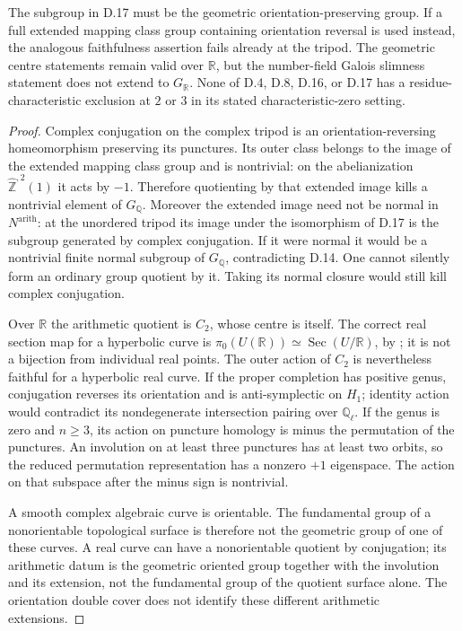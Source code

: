 The subgroup in D.17 must be the geometric orientation-preserving group.
If a full extended mapping class group containing orientation reversal is
used instead, the analogous faithfulness assertion fails already at the
tripod.  The geometric centre statements remain valid over $\mathbb R$,
but the number-field Galois slimness statement does not extend to
$G_{\mathbb R}$.  None of D.4, D.8, D.16, or D.17 has a residue-characteristic
exclusion at $2$ or $3$ in its stated characteristic-zero setting.
\begin{proof}
Complex conjugation on the complex tripod is an orientation-reversing
homeomorphism preserving its punctures.  Its outer class belongs to the
image of the extended mapping class group and is nontrivial: on the
abelianization $\widehat{\mathbb Z}^{,2}(1)$ it acts by $-1$.
Therefore quotienting by that extended image kills a nontrivial element
of $G_{\mathbb Q}$.  Moreover the extended image need not be normal in
$N^{\mathrm{arith}}$: at the unordered tripod its image under the
isomorphism of D.17 is the subgroup generated by complex conjugation.
If it were normal it would be a nontrivial finite normal subgroup of
$G_{\mathbb Q}$, contradicting D.14.  One cannot silently form an ordinary
group quotient by it.  Taking its normal closure would still kill complex
conjugation.

Over $\mathbb R$ the arithmetic quotient is $C_2$, whose centre is itself.
The correct real section map for a hyperbolic curve is
$\pi_0(U(\mathbb R))\simeq\operatorname{Sec}(U/\mathbb R)$, by
\citet[Introduction, Theorem]{BrescianiVistoli2020}; it is not a bijection
from individual real points.  The outer action of $C_2$ is nevertheless
faithful for a hyperbolic real curve.  If the proper completion has positive
genus, conjugation reverses its orientation and is anti-symplectic on
$H_1$; identity action would contradict its nondegenerate intersection
pairing over $\mathbb Q_\ell$.  If the genus is zero and $n\geq3$, its action
on puncture homology is minus the permutation of the punctures.  An
involution on at least three punctures has at least two orbits, so the
reduced permutation representation has a nonzero $+1$ eigenspace.
The action on that subspace after the minus sign is nontrivial.

A smooth complex algebraic curve is orientable.  The fundamental group of
a nonorientable topological surface is therefore not the geometric group
of one of these curves.  A real curve can have a nonorientable quotient by
conjugation; its arithmetic datum is the geometric oriented group together
with the involution and its extension, not the fundamental group of the
quotient surface alone.  The orientation double cover does not identify
these different arithmetic extensions.


\end{proof}
